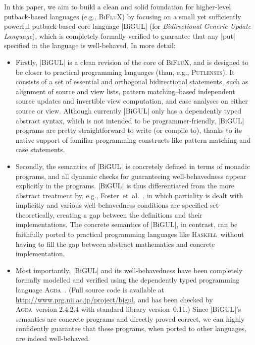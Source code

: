 \documentclass{sigplanconf}
\renewcommand{\emph}{\textsl}
\newcommand{\Putlenses}{\textsc{Putlenses}}
\newcommand{\BiFluX}{\textsc{BiFluX}}
\newcommand{\Agda}{\textsc{Agda}}
\newcommand{\Haskell}{\textsc{Haskell}}
\begin{document}
In this paper, we aim to build a clean and solid foundation for higher-level putback-based languages (e.g., \BiFluX) by focusing on a small yet sufficiently powerful putback-based core language |BiGUL| (for \emph{Bidirectional Generic Update Language}), which is completely formally verified to guarantee that any |put| specified in the language is well-behaved.
In more detail:
\begin{itemize}[leftmargin=*]
\item Firstly, |BiGUL| is a clean revision of the core of \BiFluX, and is designed to be closer to practical programming languages (than, e.g., \Putlenses).
It consists of a set of essential and orthogonal bidirectional statements, such as alignment of source and view lists, pattern matching--based independent source updates and invertible view computation, and case analyses on either source or view.
Although currently |BiGUL| only has a dependently typed abstract syntax, which is not intended to be programmer-friendly, |BiGUL| programs are pretty straightforward to write (or compile to), thanks to its native support of familiar programming constructs like pattern matching and case statements.

\item Secondly, the semantics of |BiGUL| is concretely defined in terms of monadic programs, and all dynamic checks for guaranteeing well-behavedness appear explicitly in the programs.
|BiGUL| is thus differentiated from the more abstract treatment by, e.g., Foster~et~al.~\cite{Foster-lenses}, in which partiality is dealt with implicitly and various well-behavedness conditions are specified set-theoretically, creating a gap between the definitions and their implementations.
The concrete semantics of |BiGUL|, in contrast, can be faithfully ported to practical programming languages like \Haskell\ without having to fill the gap between abstract mathematics and concrete implementation.

\item Most importantly, |BiGUL| and its well-behavedness have been completely formally modelled and verified using the dependently typed programming language \Agda~\cite{Norell-thesis,Nore08}.
(Full source code is available at \url{http://www.prg.nii.ac.jp/project/bigul}, and has been checked by \Agda\ version 2.4.2.4 with standard library version~0.11.)
Since |BiGUL|'s semantics are concrete programs and directly proved correct, we can highly confidently guarantee that these programs, when ported to other languages, are indeed well-behaved.


\end{itemize}
\end{document}
